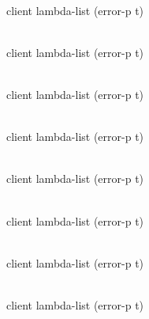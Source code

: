 \\
{client lambda-list \key (error-p t)}

\\
{client lambda-list \key (error-p t)}

\\
{client lambda-list \key (error-p t)}

\\
{client lambda-list \key (error-p t)}

\\
{client lambda-list \key (error-p t)}

\\
{client lambda-list \key (error-p t)}

\\
{client lambda-list \key (error-p t)}

\\
{client lambda-list \key (error-p t)}
